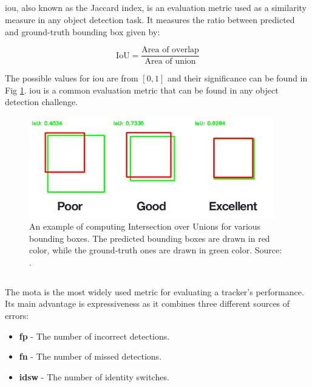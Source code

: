     \subsection{}
        \Gls{iou}, also known as the Jaccard index, is an evaluation metric used as a similarity measure in any object detection task. It measures the ratio between predicted and ground-truth bounding box given by:
        
        \begin{equation}
            \text{IoU} = \frac{\text{Area of overlap}}{\text{Area of union}} 
        \end{equation}
        
        The possible values for \gls{iou} are from $[0, 1]$ and their significance can be found in Fig \ref{fig:iou-examples}. \Gls{iou} is a common evaluation metric that can be found in any object detection challenge.

        \begin{figure}[ht]
            \centering
            \includegraphics[width=0.95\textwidth]{resources/iou_examples.png}
            \caption{An example of computing Intersection over Unions for various bounding boxes. The predicted bounding boxes are drawn in red color, while the ground-truth ones are drawn in green color. Source: \cite{iourosebrock}.}
            \label{fig:iou-examples}
        \end{figure}
        
    \subsection{}
        The \gls{mota} is the most widely used metric for evaluating a tracker's performance. Its main advantage is expressiveness as it combines three different sources of errors:
        
        \begin{itemize}
            \item \textbf{\Gls{fp}} - The number of incorrect detections.
            \item \textbf{\Gls{fn}} - The number of missed detections.
            \item \textbf{\Gls{idsw}} - The number of identity switches.
        \end{itemize}


